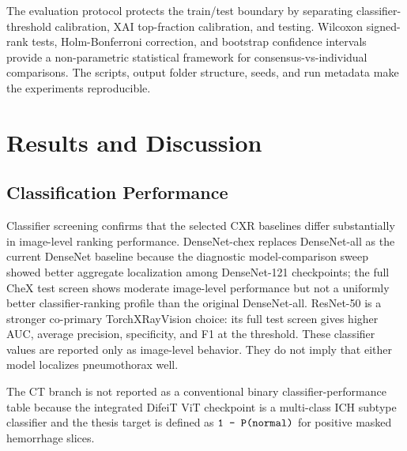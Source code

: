 The evaluation protocol protects the train/test boundary by separating
classifier-threshold calibration, XAI top-fraction calibration, and
testing. Wilcoxon signed-rank tests,
Holm-Bonferroni correction, and bootstrap confidence intervals provide a
non-parametric statistical framework for consensus-vs-individual
comparisons. The scripts, output folder structure, seeds, and run metadata make
the experiments reproducible.

\hypertarget{results-and-discussion}{%
	\chapter{Results and Discussion}\label{results-and-discussion}}

\hypertarget{classification-performance}{%
	\section{Classification Performance}\label{classification-performance}}

Classifier screening confirms that the selected CXR baselines differ
substantially in image-level ranking performance. DenseNet-chex replaces
DenseNet-all as the current DenseNet baseline because the diagnostic
model-comparison sweep showed
better aggregate localization among DenseNet-121 checkpoints; the full
CheX test screen shows moderate
image-level performance but not a uniformly better classifier-ranking
profile than the original DenseNet-all. ResNet-50 is a stronger
co-primary TorchXRayVision choice: its full test screen gives higher
AUC, average precision, specificity, and F1 at the threshold.
These classifier values are reported only as image-level behavior. They
do not imply that either model localizes pneumothorax well.

The CT branch is not reported as a conventional binary
classifier-performance table because the integrated DifeiT ViT
checkpoint is a multi-class ICH subtype classifier and the thesis target
is defined as $\texttt{1\ -\allowbreak \ P(normal)}$ for positive masked hemorrhage
slices. 

